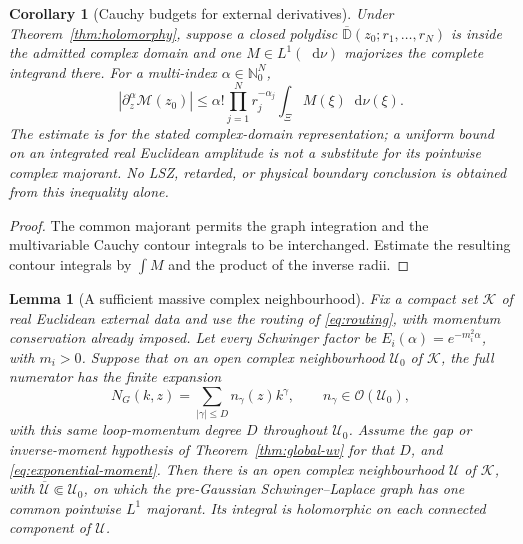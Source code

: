 \documentclass[final,5p,times,twocolumn,numbers,nopreprintline]{elsarticle}
\numberwithin{equation}{section}
\newtheorem{lemma}[theorem]{Lemma}
\newtheorem{corollary}[theorem]{Corollary}
\theoremstyle{definition}
\theoremstyle{remark}
\newcommand{\dd}{\mathop{}\!\mathrm d}
\begin{document}
\begin{corollary}[Cauchy budgets for external derivatives]
\label{cor:complex-derivative-budget}
Under Theorem~\ref{thm:holomorphy}, suppose a closed polydisc
$\overline{\mathbb D}(z_0;r_1,\ldots,r_N)$ is inside the admitted
complex domain and one $M\in L^1(\dd\nu)$ majorizes the complete
integrand there. For a multi-index $\alpha\in\mathbb N_0^N$,
\begin{equation}
 |\partial_z^\alpha\mathcal M(z_0)|
  \leq\alpha!\prod_{j=1}^N r_j^{-\alpha_j}
                  \int_\Xi M(\xi)\dd\nu(\xi).
 \label{eq:complex-Cauchy-budget}
\end{equation}
The estimate is for the stated complex-domain representation; a
uniform bound on an \emph{integrated real} Euclidean amplitude is not
a substitute for its pointwise complex majorant. No LSZ, retarded, or
physical boundary conclusion is obtained from this inequality alone.
\end{corollary}
\begin{proof}
The common majorant permits the graph integration and the
multivariable Cauchy contour integrals to be interchanged. Estimate
the resulting contour integrals by $\int M$ and the product of the
inverse radii.
\end{proof}

\begin{lemma}[A sufficient massive complex neighbourhood]
\label{lem:massive-neighbourhood}
Fix a compact set \(\mathcal K\) of real Euclidean external data
and use the routing of \eqref{eq:routing}, with momentum conservation
already imposed. Let every Schwinger factor be
\(E_i(\alpha)=e^{-m_i^2\alpha}\), with \(m_i>0\).
Suppose that on an open complex neighbourhood \(\mathcal U_0\)
of \(\mathcal K\), the full numerator has the finite expansion
\[
 N_G(k,z)=\sum_{|\gamma|\leq D}n_\gamma(z)k^\gamma,
 \qquad n_\gamma\in\mathcal O(\mathcal U_0),
\]
with this same loop-momentum degree \(D\) throughout
\(\mathcal U_0\). Assume the gap or inverse-moment hypothesis of
Theorem~\ref{thm:global-uv} for that \(D\), and
\eqref{eq:exponential-moment}. Then there is an open complex
neighbourhood \(\mathcal U\) of \(\mathcal K\), with
\(\overline{\mathcal U}\Subset\mathcal U_0\), on which the
pre-Gaussian Schwinger--Laplace graph has one common pointwise
\(L^1\) majorant. Its integral is holomorphic on each connected
component of \(\mathcal U\).
\end{lemma}
\end{document}
